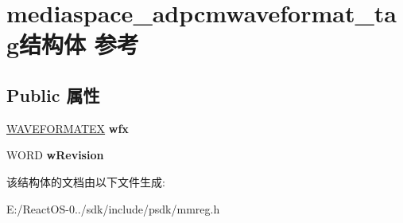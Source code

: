 \hypertarget{structmediaspace__adpcmwaveformat__tag}{}\section{mediaspace\+\_\+adpcmwaveformat\+\_\+tag结构体 参考}
\label{structmediaspace__adpcmwaveformat__tag}
\subsection*{Public 属性}
\begin{DoxyCompactItemize}
\item 
\mbox{\label{structmediaspace__adpcmwaveformat__tag_aeb548738b1718c7a11eb0d1d058f8c41}} 
\hyperlink{struct_w_a_v_e_f_o_r_m_a_t_e_x}{W\+A\+V\+E\+F\+O\+R\+M\+A\+T\+EX} {\bfseries wfx}
\item 
\mbox{\label{structmediaspace__adpcmwaveformat__tag_ae620a0a8ff8bb480a726140de0187f56}} 
W\+O\+RD {\bfseries w\+Revision}
\end{DoxyCompactItemize}


该结构体的文档由以下文件生成\+:\begin{DoxyCompactItemize}
\item 
E\+:/\+React\+O\+S-\/0../sdk/include/psdk/mmreg.\+h\end{DoxyCompactItemize}

